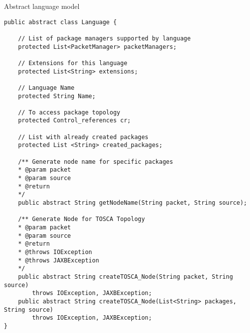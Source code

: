 \begin{Listing}
	\caption{Abstract language model}
	\label{lst:langabst}
\begin{lstlisting}
public abstract class Language {
	
	// List of package managers supported by language
	protected List<PacketManager> packetManagers;
	
	// Extensions for this language
	protected List<String> extensions;
	
	// Language Name
	protected String Name;
	
	// To access package topology
	protected Control_references cr;
	
	// List with already created packages
	protected List <String> created_packages;
	
	/**	Generate node name for specific packages
	* @param packet
	* @param source
	* @return
	*/
	public abstract String getNodeName(String packet, String source);
	
	/**	Generate Node for TOSCA Topology
	* @param packet
	* @param source
	* @return
	* @throws IOException
	* @throws JAXBException
	*/
	public abstract String createTOSCA_Node(String packet, String source)
		throws IOException, JAXBException;
	public abstract String createTOSCA_Node(List<String> packages, String source) 
		throws IOException, JAXBException;
}
\end{lstlisting}
\end{Listing}
